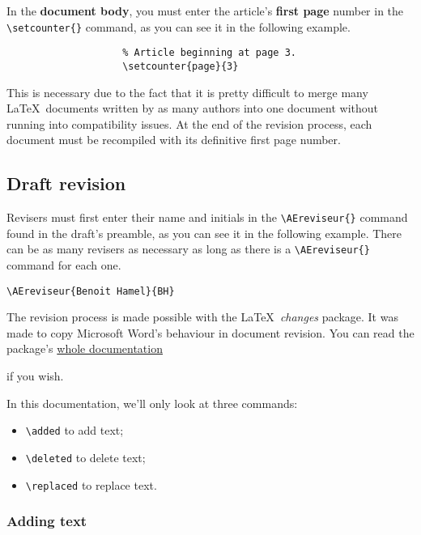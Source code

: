 \documentclass[english]{article}
\newcommand{\cmd}[1]{%
	\texttt{\textbackslash#1\{\}}
}
\newcommand{\dec}[1]{%
	\texttt{\textbackslash#1}
}
\newcommand{\lien}[2]{%
	\href{#1}{#2 \faIcon{external-link-alt}}
}
\begin{document}
			In the \textbf{document body}, you must enter the article's \textbf{first page} number in the
			\cmd{setcounter} command, as you can see it in the following example.
			
			\begin{shaded*}
				\begin{verbatim}
					% Article beginning at page 3.
					\setcounter{page}{3}
				\end{verbatim}
			\end{shaded*}
			
			This is necessary due to the fact that it is pretty difficult to merge many \LaTeX\ documents written
			by as many authors into one document without running into compatibility issues. At the end of the
			revision process, each document must be recompiled with its definitive first page number.
			
		\subsection{Draft revision}
		
			Revisers must first enter their name and initials in the \cmd{AEreviseur} command found in the draft's
			preamble, as you can see it in the following example. There can be as many revisers as necessary as
			long as there is a \cmd{AEreviseur} command for each one.
			
			\begin{shaded*}
				\verb|\AEreviseur{Benoit Hamel}{BH}|
			\end{shaded*}
		
			The revision process is made possible with the \LaTeX\ \emph{changes} package. It was made to
			copy Microsoft Word's behaviour in document revision. You can read the package's
			\lien{http://mirrors.ctan.org/macros/latex/contrib/changes/changes.english.pdf}{whole documentation}
			if you wish.
			
			In this documentation, we'll only look at three commands:
			
			\begin{itemize}
				\item \dec{added} to add text;
				\item \dec{deleted} to delete text;
				\item \dec{replaced} to replace text.
			\end{itemize}
		
			\subsubsection{Adding text}
			
\end{document}
